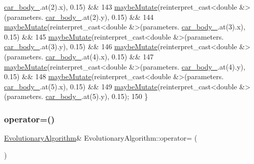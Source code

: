 \begin{DoxyCode}
      \hyperlink{classCarParameters_a304345d7fd7771c87421e87785bce810}{car\_body\_}.at(2).x), 0.15) &&
143            \hyperlink{classEvolutionaryAlgorithm_a19c58cc0434d314fb5378e3674546988}{maybeMutate}(reinterpret\_cast<double &>(parameters.
      \hyperlink{classCarParameters_a304345d7fd7771c87421e87785bce810}{car\_body\_}.at(2).y), 0.15) &&
144            \hyperlink{classEvolutionaryAlgorithm_a19c58cc0434d314fb5378e3674546988}{maybeMutate}(reinterpret\_cast<double &>(parameters.
      \hyperlink{classCarParameters_a304345d7fd7771c87421e87785bce810}{car\_body\_}.at(3).x), 0.15) &&
145            \hyperlink{classEvolutionaryAlgorithm_a19c58cc0434d314fb5378e3674546988}{maybeMutate}(reinterpret\_cast<double &>(parameters.
      \hyperlink{classCarParameters_a304345d7fd7771c87421e87785bce810}{car\_body\_}.at(3).y), 0.15) &&
146            \hyperlink{classEvolutionaryAlgorithm_a19c58cc0434d314fb5378e3674546988}{maybeMutate}(reinterpret\_cast<double &>(parameters.
      \hyperlink{classCarParameters_a304345d7fd7771c87421e87785bce810}{car\_body\_}.at(4).x), 0.15) &&
147            \hyperlink{classEvolutionaryAlgorithm_a19c58cc0434d314fb5378e3674546988}{maybeMutate}(reinterpret\_cast<double &>(parameters.
      \hyperlink{classCarParameters_a304345d7fd7771c87421e87785bce810}{car\_body\_}.at(4).y), 0.15) &&
148            \hyperlink{classEvolutionaryAlgorithm_a19c58cc0434d314fb5378e3674546988}{maybeMutate}(reinterpret\_cast<double &>(parameters.
      \hyperlink{classCarParameters_a304345d7fd7771c87421e87785bce810}{car\_body\_}.at(5).x), 0.15) &&
149            \hyperlink{classEvolutionaryAlgorithm_a19c58cc0434d314fb5378e3674546988}{maybeMutate}(reinterpret\_cast<double &>(parameters.
      \hyperlink{classCarParameters_a304345d7fd7771c87421e87785bce810}{car\_body\_}.at(5).y), 0.15);
150 \}
\end{DoxyCode}
\mbox{\label{classEvolutionaryAlgorithm_a4726d79d2cfc00b01f521a2fb8b87863}} 
\subsubsection{\texorpdfstring{operator=()}{operator=()}}
{\footnotesize\ttfamily \hyperlink{classEvolutionaryAlgorithm}{Evolutionary\+Algorithm}\& Evolutionary\+Algorithm\+::operator= (\begin{DoxyParamCaption}\item[{const \hyperlink{classEvolutionaryAlgorithm}{Evolutionary\+Algorithm} \&}]{ }\end{DoxyParamCaption})\hspace{0.3cm}{\ttfamily [delete]}}

